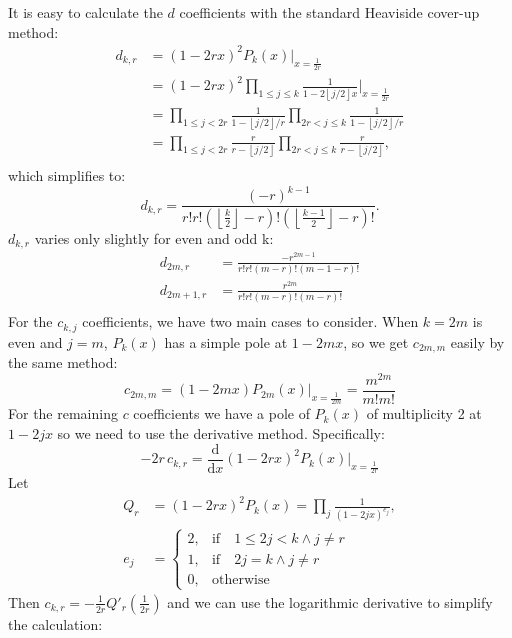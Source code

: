 \documentclass[a4paper]{amsart}
\newcommand{\floor}[1]{\left\lfloor #1 \right\rfloor}
\begin{document}
It is easy to calculate the $d$ coefficients with the standard Heaviside cover-up method:
$$
\begin{aligned}
    d_{k,r} &= (1-2rx)^2P_k(x)|_{x=\frac{1}{2r}} \\
    &= (1-2rx)^2 \prod_{1 \leq j \leq k} \frac{1}{1-2 \floor{j/2}x} \bigg|_{x=\frac{1}{2r}} \\
    &= \prod_{1 \leq j < 2r} \frac{1}{1-\floor{j/2}/r} \prod_{2r < j \leq k} \frac{1}{1- \floor{j/2}/r} \\
    &= \prod_{1 \leq j < 2r} \frac{r}{r-\floor{j/2}} \prod_{2r < j \leq k} \frac{r}{r- \floor{j/2}}, \\
\end{aligned}
$$
which simplifies to:
\begin{equation}\label{d-k-r}
        d_{k,r}=\frac{(-r)^{k-1}}{r!r!(\floor{\frac{k}{2}}-r)!(\floor{\frac{k-1}{2}}-r)!}.
\end{equation}
$d_{k,r}$ varies only slightly for even and odd k:
$$
\begin{aligned}
    d_{2m,r} &= \frac{-r^{2m-1}}{r!r!(m-r)!(m-1-r)!} \\
    d_{2m+1,r} &= \frac{r^{2m}}{r!r!(m-r)!(m-r)!} \\
\end{aligned}
$$
For the $c_{k,j}$ coefficients, we have two main cases to consider. When $k=2m$ is even and $j=m$, $P_k(x)$ has a simple pole at $1-2mx$, so we get $c_{2m,m}$ easily by the same method:
\begin{equation}\label{c-2m-m}
    c_{2m,m} = (1-2mx)P_{2m}(x)|_{x=\frac{1}{2m}} = \frac{m^{2m}}{m!m!}
\end{equation}
For the remaining $c$ coefficients  we have a pole of $P_k(x)$ of multiplicity 2 at $1-2jx$ so we need to use the derivative method. Specifically:
$$
-2r\,c_{k,r} = \frac{\mathrm{d}}{\mathrm{d}x} (1-2rx)^2P_k(x)\bigg|_{x=\frac{1}{2r}}
$$
Let 
$$
\begin{aligned}
Q_r &= (1-2rx)^2 P_k(x) = \prod_{j} \frac{1}{(1-2jx)^{e_j}},\\
e_j &= 
    \begin{cases} 
    2,& \mathrm{if}\quad 1 \leq 2j < k \land  j \neq r \\ 
    1, & \mathrm{if} \quad 2j = k \land j \neq r \\
    0, & \mathrm{otherwise}
    \end{cases}
\end{aligned}
$$
Then $c_{k,r} = -\frac{1}{2r}Q'_r\left (\frac{1}{2r} \right)$ and we can use the logarithmic derivative to simplify the calculation:
\end{document}

